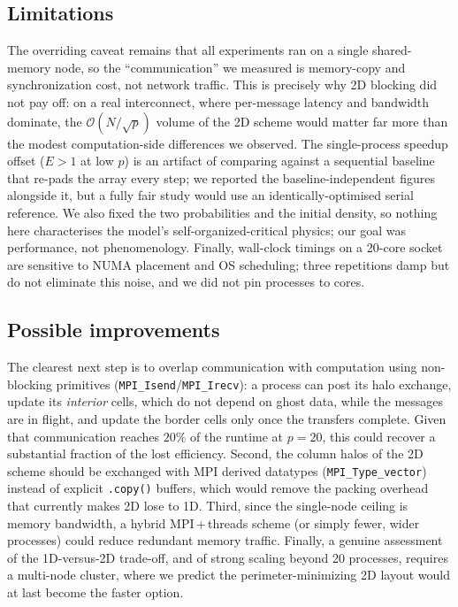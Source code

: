 \subsection{Limitations}
The overriding caveat remains that all experiments ran on a single shared-memory node, so the ``communication'' we measured is memory-copy and synchronization cost, not network traffic. This is precisely why 2D blocking did not pay off: on a real interconnect, where per-message latency and bandwidth dominate, the $\mathcal{O}(N/\sqrt{p})$ volume of the 2D scheme would matter far more than the modest computation-side differences we observed. The single-process speedup offset ($E>1$ at low $p$) is an artifact of comparing against a sequential baseline that re-pads the array every step; we reported the baseline-independent figures alongside it, but a fully fair study would use an identically-optimised serial reference. We also fixed the two probabilities and the initial density, so nothing here characterises the model's self-organized-critical physics; our goal was performance, not phenomenology. Finally, wall-clock timings on a 20-core socket are sensitive to NUMA placement and OS scheduling; three repetitions damp but do not eliminate this noise, and we did not pin processes to cores.

\subsection{Possible improvements}
The clearest next step is to overlap communication with computation using non-blocking primitives (\texttt{MPI\_Isend}/\texttt{MPI\_Irecv}): a process can post its halo exchange, update its \emph{interior} cells, which do not depend on ghost data, while the messages are in flight, and update the border cells only once the transfers complete. Given that communication reaches $20\%$ of the runtime at $p=20$, this could recover a substantial fraction of the lost efficiency. Second, the column halos of the 2D scheme should be exchanged with MPI derived datatypes (\texttt{MPI\_Type\_vector}) instead of explicit \texttt{.copy()} buffers, which would remove the packing overhead that currently makes 2D lose to 1D. Third, since the single-node ceiling is memory bandwidth, a hybrid MPI\,+\,threads scheme (or simply fewer, wider processes) could reduce redundant memory traffic. Finally, a genuine assessment of the 1D-versus-2D trade-off, and of strong scaling beyond 20 processes, requires a multi-node cluster, where we predict the perimeter-minimizing 2D layout would at last become the faster option.
